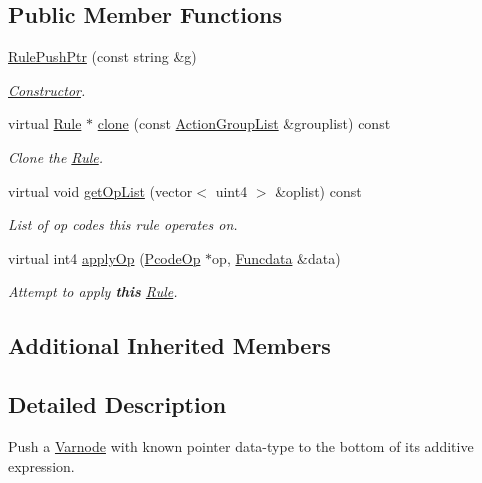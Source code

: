 \subsection*{Public Member Functions}
\begin{DoxyCompactItemize}
\item 
\mbox{\hyperlink{class_rule_push_ptr_a8e5a85fa15fb847590ad04b52c83b609}{Rule\+Push\+Ptr}} (const string \&g)
\begin{DoxyCompactList}\small\item\em \mbox{\hyperlink{class_constructor}{Constructor}}. \end{DoxyCompactList}\item 
virtual \mbox{\hyperlink{class_rule}{Rule}} $\ast$ \mbox{\hyperlink{class_rule_push_ptr_aff0b20b5e618f30ed4be5fb948766669}{clone}} (const \mbox{\hyperlink{class_action_group_list}{Action\+Group\+List}} \&grouplist) const
\begin{DoxyCompactList}\small\item\em Clone the \mbox{\hyperlink{class_rule}{Rule}}. \end{DoxyCompactList}\item 
virtual void \mbox{\hyperlink{class_rule_push_ptr_a6c610129395e97ca75570fbb88565b35}{get\+Op\+List}} (vector$<$ uint4 $>$ \&oplist) const
\begin{DoxyCompactList}\small\item\em List of op codes this rule operates on. \end{DoxyCompactList}\item 
virtual int4 \mbox{\hyperlink{class_rule_push_ptr_a6785d1d9de50ecb56918711aa413d7dc}{apply\+Op}} (\mbox{\hyperlink{class_pcode_op}{Pcode\+Op}} $\ast$op, \mbox{\hyperlink{class_funcdata}{Funcdata}} \&data)
\begin{DoxyCompactList}\small\item\em Attempt to apply {\bfseries{this}} \mbox{\hyperlink{class_rule}{Rule}}. \end{DoxyCompactList}\end{DoxyCompactItemize}
\subsection*{Additional Inherited Members}


\subsection{Detailed Description}
Push a \mbox{\hyperlink{class_varnode}{Varnode}} with known pointer data-\/type to the bottom of its additive expression. 

